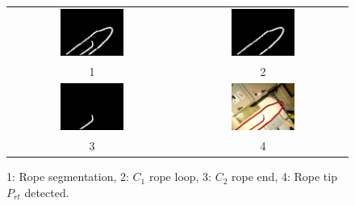             \begin{figure}
                \centering
                \begin{tabular}{cc}
                \includegraphics[width=0.39\textwidth]{RopeSegmentationAdj.png}
                &
                \includegraphics[width=0.39\textwidth]{RopeLoopAdj.png}
                \\
                1 & 2 \\
                \includegraphics[width=0.39\textwidth]{RopeEndAdj.png}
                &
                \includegraphics[width=0.39\textwidth]{RopeEndDetectedAdj.png} \\
                3 & 4 \\

                \end{tabular}
                \caption{1: Rope segmentation, 2: $C_1$ rope loop, 3: $C_2$ rope end, 4: Rope tip $P_{rt}$ detected.}
                \label{fig:RopeEndDetection}
            \end{figure}


